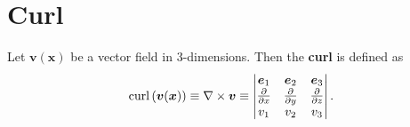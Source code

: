 \section{Curl}

\begin{definition}[Curl]
    Let $\bm v(\bm x)$ be a vector field in 3-dimensions. Then the \textbf{curl} is defined as
    \[ 
        \operatorname{curl}{(\bm v(\bm x))} \equiv
        \nabla \times \bm v \equiv
        \begin{vmatrix}
            \bm e_1 & \bm e_2 & \bm e_3 \\
            \frac{\partial}{\partial x} & \frac{\partial}{\partial y} & \frac{\partial}{\partial z} \\
            v_1 & v_2 & v_3 \\
        \end{vmatrix}
        .
    \]
\end{definition}

